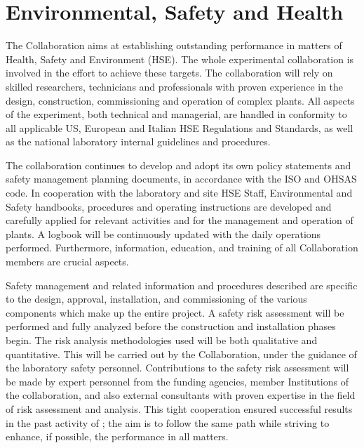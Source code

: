 



\section{Environmental, Safety and Health}

The Collaboration aims at establishing outstanding performance in matters of Health, Safety and Environment (HSE).  The whole experimental collaboration is involved in the effort to achieve these targets.  The collaboration will rely on skilled researchers, technicians and professionals with proven experience in the design, construction, commissioning and operation of complex plants.  All aspects of the experiment, both technical and managerial, are handled in conformity to all applicable US, European and Italian HSE Regulations and Standards, as well as the national laboratory internal guidelines and procedures. 

The collaboration continues to develop and adopt its own policy statements and safety management planning documents, in accordance with the ISO and OHSAS code.  In cooperation with the laboratory and site HSE Staff, Environmental and Safety handbooks, procedures and operating instructions are developed and carefully applied for relevant activities and for the management and operation of plants.  A logbook will be continuously updated with the daily operations performed.  Furthermore, information, education, and training of all Collaboration members are crucial aspects.

Safety management and related information and procedures described are specific to the design, approval, installation, and commissioning of the various components which make up the entire project.  A safety risk assessment will be performed and fully analyzed before the construction and installation phases begin.  The risk analysis methodologies used will be both qualitative and quantitative.  This will be carried out by the Collaboration, under the guidance of the laboratory safety personnel.  Contributions to the safety risk assessment will be made by expert personnel from the funding agencies, member Institutions of the collaboration, and also external consultants with proven expertise in the field of risk assessment and analysis.  This tight cooperation ensured successful results in the past activity of \DSf; the aim is to follow the same path while striving to enhance, if possible, the performance in all  matters.

